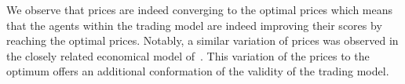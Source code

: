 \documentclass{wscpaperproc}
\newcommand{\memo}[2]{\textcolor{#1}{#2}}
\renewcommand{\memo}[2]{} %
\newcommand{\jm}[1]{\memo{blue}{JM: #1\\}}
\newcommand{\xrc}[1]{\memo{orange}{XRC: #1\\}}
\begin{document}
We observe that prices are indeed converging to the optimal prices which means that the agents within the trading model are indeed improving their scores by reaching the optimal prices. Notably, a similar variation of prices was observed in the closely related economical model of~\cite{gintis_emergence_2006}. This variation of the prices to the optimum offers an additional conformation of the validity of the trading model. 

%
%
%
%
\end{document}
